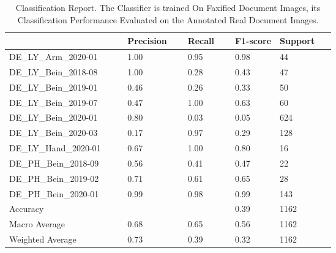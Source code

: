\begin{center}
\begin{table}[H]
    \begin{center}
    \begin{tabular}{p{0.22\linewidth} p{0.10\linewidth} p{0.10\linewidth} p{0.10\linewidth} p{0.10\linewidth}} 
        \toprule
            & Precision & Recall & F1-score & Support\\[0.0ex] 
        \midrule
        DE\_LY\_Arm\_2020-01 & 1.00 & 0.95 & 0.98 & 44\\[0.0ex]
        \midrule
        DE\_LY\_Bein\_2018-08 & 1.00 & 0.28 & 0.43 & 47\\[0.0ex]
        \midrule
        DE\_LY\_Bein\_2019-01 & 0.46 & 0.26 & 0.33 & 50\\[0.0ex]
        \midrule
        DE\_LY\_Bein\_2019-07 & 0.47 & 1.00 & 0.63 & 60\\[0.0ex]
        \midrule
        DE\_LY\_Bein\_2020-01 & 0.80 & 0.03 & 0.05 & 624\\[0.0ex]
        \midrule
        DE\_LY\_Bein\_2020-03 & 0.17 & 0.97 & 0.29 & 128\\[0.0ex]
        \midrule
        DE\_LY\_Hand\_2020-01 & 0.67 & 1.00 & 0.80 & 16\\[0.0ex]
        \midrule
        DE\_PH\_Bein\_2018-09 & 0.56 & 0.41 & 0.47 & 22\\[0.0ex]
        \midrule
        DE\_PH\_Bein\_2019-02 & 0.71 & 0.61 & 0.65 & 28\\[0.0ex]
        \midrule
        DE\_PH\_Bein\_2020-01 & 0.99 & 0.98 & 0.99 & 143\\[0.0ex]
        \midrule
        \midrule
        Accuracy              &      &      & 0.39 & 1162\\[0.0ex]
        Macro Average             & 0.68 & 0.65 & 0.56 & 1162\\[0.0ex]
        Weighted Average          & 0.73 & 0.39 & 0.32 & 1162\\[0.0ex]

        \bottomrule
    \end{tabular}
    \caption{Classification Report. The Classifier is trained On Faxified Document Images, its Classification Performance Evaluated on the Annotated Real Document Images.}
    \label{table:FaxifiedClassificationReport}
    \end{center}
\end{table}
\end{center}







